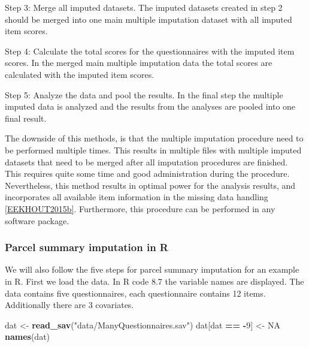 \documentclass[]{book}
\newenvironment{Shaded}{\begin{snugshade}}{\end{snugshade}}
\newcommand{\KeywordTok}[1]{\textcolor[rgb]{0.13,0.29,0.53}{\textbf{#1}}}
\newcommand{\DecValTok}[1]{\textcolor[rgb]{0.00,0.00,0.81}{#1}}
\newcommand{\StringTok}[1]{\textcolor[rgb]{0.31,0.60,0.02}{#1}}
\newcommand{\OtherTok}[1]{\textcolor[rgb]{0.56,0.35,0.01}{#1}}
\newcommand{\OperatorTok}[1]{\textcolor[rgb]{0.81,0.36,0.00}{\textbf{#1}}}
\newcommand{\NormalTok}[1]{#1}
\begin{document}
Step 3: Merge all imputed datasets. The imputed datasets created in step
2 should be merged into one main multiple imputation dataset with all
imputed item scores.

Step 4: Calculate the total scores for the questionnaires with the
imputed item scores. In the merged main multiple imputation data the
total scores are calculated with the imputed item scores.

Step 5: Analyze the data and pool the results. In the final step the
multiple imputed data is analyzed and the results from the analyses are
pooled into one final result.

The downside of this methods, is that the multiple imputation procedure
need to be performed multiple times. This results in multiple files with
multiple imputed datasets that need to be merged after all imputation
procedures are finished. This requires quite some time and good
administration during the procedure. Nevertheless, this method results
in optimal power for the analysis results, and incorporates all
available item information in the missing data handling
\ref{EEKHOUT2015b}. Furthermore, this procedure can be performed in any
software package.

\subsubsection{Parcel summary imputation in
R}\label{parcel-summary-imputation-in-r}

We will also follow the five steps for parcel summary imputation for an
example in R. First we load the data. In R code 8.7 the variable names
are displayed. The data contains five questionnaires, each questionnaire
contains 12 items. Additionally there are 3 covariates.

\begin{Shaded}
\begin{Highlighting}[]
\NormalTok{dat <-}\StringTok{ }\KeywordTok{read_sav}\NormalTok{(}\StringTok{"data/ManyQuestionnaires.sav"}\NormalTok{)}
\NormalTok{dat[dat }\OperatorTok{==}\StringTok{ }\OperatorTok{-}\DecValTok{9}\NormalTok{] <-}\StringTok{ }\OtherTok{NA}
\KeywordTok{names}\NormalTok{(dat)}
\end{Highlighting}
\end{Shaded}
\end{document}
